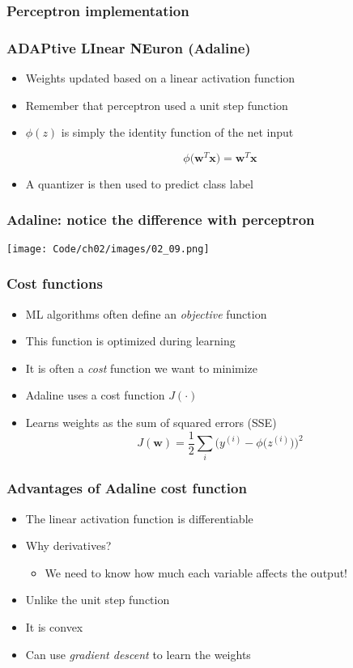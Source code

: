 \documentclass{beamer}
\begin{document}
\begin{frame}
  \frametitle{Perceptron implementation}
  \href{https://github.com/rasbt/python-machine-learning-book/blob/master/code/ch02/ch02.ipynb}{}
\end{frame}

\begin{frame}
  \frametitle{ADAPtive LInear NEuron (Adaline)}
  \begin{itemize}
  \item Weights updated based on a linear activation function
  \item Remember that perceptron used a unit step function
  \item  $\phi(z)$ is simply the identity function of the net input

    \[
    \phi \big( \mathbf{w}^T \mathbf{x} \big) = \mathbf{w}^T \mathbf{x}
    \]

    \item A quantizer is then used to predict class label
  \end{itemize}
\end{frame}

\begin{frame}
  \frametitle{Adaline: notice the difference with perceptron}
  \texttt{[image: Code/ch02/images/02\_09.png]}
\end{frame}

\begin{frame}
  \frametitle{Cost functions}
  \begin{itemize}
  \item ML algorithms often define an \emph{objective} function
  \item This function is optimized during learning
  \item It is often a \emph{cost} function we want to minimize
  \item Adaline uses a cost function $J(\cdot)$
  \item Learns weights as the sum of squared errors (SSE)
    \[
    J(\mathbf{w}) = \frac{1}{2} \sum_i \bigg(y^{(i)}  - \phi \big(z^{(i)} \big) \bigg)^2
    \]
  \end{itemize}
\end{frame}

\begin{frame}
  \frametitle{Advantages of Adaline cost function}
  \begin{itemize}
  \item The linear activation function is differentiable
  \item Why derivatives?
    \begin{itemize}
    \item We need to know how much each variable affects the output!
    \end{itemize}
  \item Unlike the unit step function
  \item It is convex
  \item Can use \emph{gradient descent} to learn the weights
  \end{itemize}
\end{frame}
\end{document}

